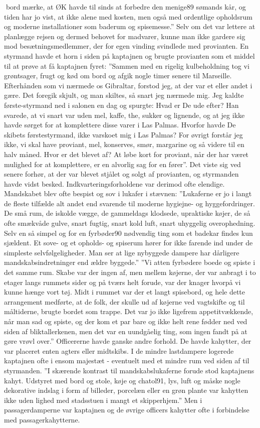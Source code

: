 bord mærke, at ØK havde til sinds at forbedre den menige89 sømands kår,
og tiden har jo vist, at ikke alene med kosten, men også med ordentlige
opholdsrum og moderne installationer som baderum og spisemesse.'' Selv
om det var lettere at planlægge rejsen og dermed behovet for madvarer,
kunne man ikke gardere sig mod besætningsmedlemmer, der for egen vinding
svindlede med provianten. En styrmand havde et horn i siden på kaptajnen
og brugte provianten som et middel til at prøve at få kaptajnen fyret:
''Sammen med en rigelig kulbeholdning tog vi grøntsager, frugt og kød om
bord og afgik nogle timer senere til Marseille. Efterhånden som vi
nærmede os Gibraltar, forstod jeg, at der var et eller andet i gære. Det
foregik skjult, og man skiltes, så snart jeg nærmede mig. Jeg kaldte
første-styrmand ned i salonen en dag og spurgte: Hvad er De ude efter?
Han svarede, at vi snart var uden mel, kaffe, the, sukker og lignende,
og at jeg ikke havde sørget for at komplettere disse varer i Las Palmas.
Hvorfor havde De skibets førstestyrmand, ikke varskoet mig i Las Palmas?
For øvrigt forstår jeg ikke, vi skal have proviant, mel, konserves,
smør, margarine og så videre til en halv måned. Hvor er det blevet af?
At løbe kort for proviant, når der har været mulighed for at
komplettere, er en alvorlig sag for en fører''. Det viste sig ved senere
forhør, at der var blevet stjålet og solgt af provianten, og styrmanden
havde vidst besked. Indkvarteringsforholdene var derimod ofte elendige.
Mandskabet blev ofte bespist og sov i lukafer i stævnen: ''Lukaferne er
jo i langt de fleste tilfælde alt andet end svarende til moderne
hygiejne- og hyggefordringer. De små rum, de iskolde vægge, de
gammeldags klodsede, upraktiske køjer, de så ofte smækvåde gulve, snart
fugtig, snart kold luft, snart uhyggelig overophedning. Selv en så
simpel og for en fyrbøder90 nødvendig ting som et badekar findes kun
sjældent. Et sove- og et opholds- og spiserum hører for ikke farende ind
under de simpleste selvfølgeligheder. Man ser at lige nybyggede dampere
har dårligere mandskabsindretninger end ældre byggede.'' ''Vi atten
fyrbødere boede og spiste i det samme rum. Skabe var der ingen af, men
mellem køjerne, der var anbragt i to etager langs rummets sider og på
tværs helt forude, var der knager hvorpå vi kunne hænge vort tøj. Midt i
rummet var der et langt spisebord, og hele dette arrangement medførte,
at de folk, der skulle ud af køjerne ved vagtskifte og til måltiderne,
brugte bordet som trappe. Det var jo ikke ligefrem appetitvækkende, når
man sad og spiste, og der kom et par bare og ikke helt rene fødder ned
ved siden af bliktallerkenen, men det var en uundgåelig ting, som ingen
fandt på at gøre vrøvl over.'' Officererne havde ganske andre forhold.
De havde kahytter, der var placeret enten agters eller midtskibs. I de
mindre lastdampere logerede kaptajnen ofte i ensom majestæt - eventuelt
med et mindre rum ved siden af til styrmanden. ''I skærende kontrast til
mandskabslukaferne forude stod kaptajnens kahyt. Udstyret med bord og
stole, køje og chatol91, lys, luft og måske nogle dekorative indslag i
form af billeder, porcelæn eller en grøn plante var kahytten ikke uden
lighed med stadsstuen i mangt et skipperhjem.'' Men i passagerdamperne
var kaptajnen og de øvrige officers kahytter ofte i forbindelse med
passagerkahytterne.

